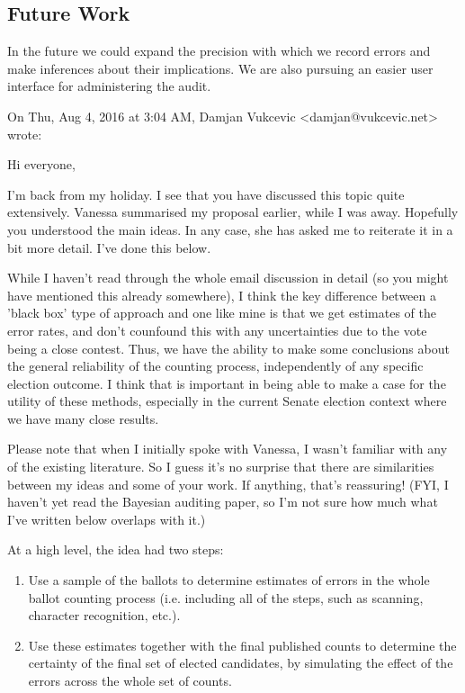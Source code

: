 \documentclass[10pt,a4paper]{article}
\newcommand{\longVersion}[1]{#1}
\newcommand{\longVersion}[1]{}
\begin{document}
\subsection{Future Work}
In the future we could expand the precision with which we record errors and make inferences about their implications.
We are also pursuing an easier user interface for administering the audit.

\longVersion{


On Thu, Aug 4, 2016 at 3:04 AM, Damjan Vukcevic <damjan@vukcevic.net> wrote:


    Hi everyone,

    I'm back from my holiday.  I see that you have discussed this topic quite extensively.  Vanessa summarised my proposal earlier, while I was away.  Hopefully you understood the main ideas.  In any case, she has asked me to reiterate it in a bit more detail.  I've done this below.

    While I haven't read through the whole email discussion in detail (so you might have mentioned this already somewhere), I think the key difference between a 'black box' type of approach and one like mine is that we get estimates of the error rates, and don't counfound this with any uncertainties due to the vote being a close contest.  Thus, we have the ability to make some conclusions about the general reliability of the counting process, independently of any specific election outcome.  I think that is important in being able to make a case for the utility of these methods, especially in the current Senate election context where we have many close results.

    Please note that when I initially spoke with Vanessa, I wasn't familiar with any of the existing literature.  So I guess it's no surprise that there are similarities between my ideas and some of your work.  If anything, that's reassuring!  (FYI, I haven't yet read the Bayesian auditing paper, so I'm not sure how much what I've written below overlaps with it.)



    At a high level, the idea had two steps:

\begin{enumerate}
\item Use a sample of the ballots to determine estimates of errors in the whole ballot counting process (i.e. including all of the steps, such as scanning, character recognition, etc.).  \label{sample}

\item Use these estimates together with the final published counts to determine the certainty of the final set of elected candidates, by simulating the effect of the errors across the whole set of counts.  \label{useEstimates}
\end{enumerate}


}
\end{document}
